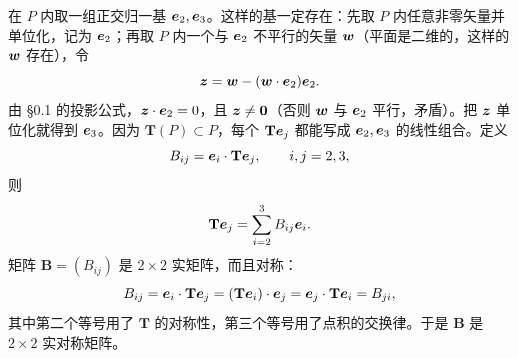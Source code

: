 \documentclass[11pt]{ctexart}
\newcommand{\ten}[1]{\mathbf{#1}}
\begin{document}
在 $P$ 内取一组正交归一基 $\boldsymbol{e}_2,\boldsymbol{e}_3$。这样的基一定存在：先取 $P$ 内任意非零矢量并单位化，记为 $\boldsymbol{e}_2$；再取 $P$ 内一个与 $\boldsymbol{e}_2$ 不平行的矢量 $\boldsymbol{w}$（平面是二维的，这样的 $\boldsymbol{w}$ 存在），令
\[
\boldsymbol{z}=\boldsymbol{w}-(\boldsymbol{w}\cdot\boldsymbol{e}_2)\boldsymbol{e}_2 .
\]
由 \S0.1 的投影公式，$\boldsymbol{z}\cdot\boldsymbol{e}_2=0$，且 $\boldsymbol{z}\ne\boldsymbol{0}$（否则 $\boldsymbol{w}$ 与 $\boldsymbol{e}_2$ 平行，矛盾）。把 $\boldsymbol{z}$ 单位化就得到 $\boldsymbol{e}_3$。因为 $\ten T(P)\subset P$，每个 $\ten T\vect e_j$ 都能写成 $\boldsymbol{e}_2,\boldsymbol{e}_3$ 的线性组合。定义
\[
B_{ij}=\vect e_i\cdot\ten T\vect e_j,\qquad i,j=2,3,
\]
则
\[
\ten T\vect e_j=\sum_{i=2}^{3}B_{ij}\vect e_i .
\]
矩阵 $\ten B=(B_{ij})$ 是 $2\times2$ 实矩阵，而且对称：
\[
B_{ij}=\vect e_i\cdot\ten T\vect e_j
=(\ten T\vect e_i)\cdot\vect e_j
=\vect e_j\cdot\ten T\vect e_i
=B_{ji},
\]
其中第二个等号用了 $\ten T$ 的对称性，第三个等号用了点积的交换律。于是 $\ten B$ 是 $2\times2$ 实对称矩阵。
\end{document}
